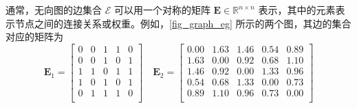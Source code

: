 通常，无向图的边集合 $\mathcal E$ 可以用一个对称的矩阵 $\mathbf E \in \mathbb R^{n \times n}$ 表示，其中的元素表示节点之间的连接关系或权重。例如，\cref{fig_graph_eg} 所示的两个图，其边的集合对应的矩阵为
$$
    \mathbf{E}_1 =
    \begin{bmatrix}
        0 & 0 & 1 & 1 & 0 \\
        0 & 0 & 1 & 0 & 1 \\
        1 & 1 & 0 & 1 & 1 \\
        1 & 0 & 1 & 0 & 1 \\
        0 & 1 & 1 & 1 & 0 \\
    \end{bmatrix} \quad \mathbf{E}_2 =
    \begin{bmatrix}
        0.00 & 1.63 & 1.46 & 0.54 & 0.89 \\
        1.63 & 0.00 & 0.92 & 0.68 & 1.10 \\
        1.46 & 0.92 & 0.00 & 1.33 & 0.96 \\
        0.54 & 0.68 & 1.33 & 0.00 & 0.73 \\
        0.89 & 1.10 & 0.96 & 0.73 & 0.00 \\
    \end{bmatrix}
$$
